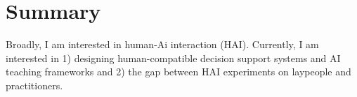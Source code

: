 
\section{Summary}




Broadly, I am interested in human-Ai interaction (HAI). Currently, I am interested in 1) designing human-compatible decision support systems and AI teaching frameworks and 2) the gap between HAI experiments on laypeople and practitioners.



